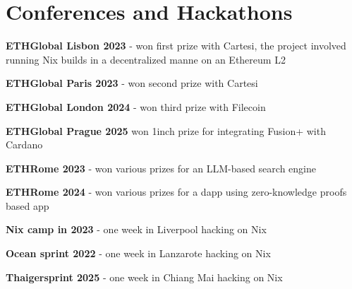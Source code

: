 \documentclass[]{cv}
\begin{document}
\begin{minipage}[t]{0.75\textwidth}
\section{Conferences and Hackathons}
\vspace{+0.5em}
\begin{tightemize}
\item \textbf{ETHGlobal Lisbon 2023} - won first prize with Cartesi, the project involved running Nix builds in a decentralized manne on an Ethereum L2
\item \textbf{ETHGlobal Paris 2023} - won second prize with Cartesi
\item \textbf{ETHGlobal London 2024} - won third prize with Filecoin
\item \textbf{ETHGlobal Prague 2025} won 1inch prize for integrating Fusion+ with Cardano
\item \textbf{ETHRome 2023} - won various prizes for an LLM-based search engine
\item \textbf{ETHRome 2024} - won various prizes for a dapp using zero-knowledge proofs based app
\item \textbf{Nix camp in 2023} - one week in Liverpool hacking on Nix
\item \textbf{Ocean sprint 2022} - one week in Lanzarote hacking on Nix
\item \textbf{Thaigersprint 2025} - one week in Chiang Mai hacking on Nix
\end{tightemize}
\sectionsep

\end{minipage}
\hfill
\end{document}
